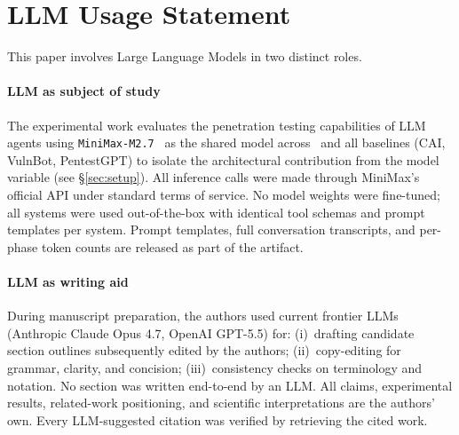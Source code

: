 
\section*{LLM Usage Statement}
\label{sec:llm-usage}

This paper involves Large Language Models in two distinct roles.

\paragraph{LLM as subject of study}
The experimental work evaluates the penetration testing capabilities of LLM
agents using \texttt{MiniMax-M2.7}~\cite{minimax27} as the shared model across
\harnessname\ and all baselines (CAI, VulnBot, PentestGPT) to isolate the
architectural contribution from the model variable (see \S\ref{sec:setup}).
All inference calls were made through MiniMax's official API under standard
terms of service. No model weights were fine-tuned; all systems were used
out-of-the-box with identical tool schemas and prompt templates per system.
Prompt templates, full conversation transcripts, and per-phase token counts
are released as part of the artifact.

\paragraph{LLM as writing aid}
During manuscript preparation, the authors used current frontier LLMs
(Anthropic Claude Opus 4.7, OpenAI GPT-5.5) for: (i)~drafting candidate
section outlines subsequently edited by the authors; (ii)~copy-editing for
grammar, clarity, and concision; (iii)~consistency checks on terminology and
notation. No section was written end-to-end by an LLM. All claims,
experimental results, related-work positioning, and scientific interpretations
are the authors' own. Every LLM-suggested citation was verified by retrieving
the cited work.

